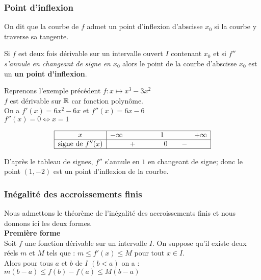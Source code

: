   \subsubsection*{Point d'inflexion}
  \begin{definition}
  On dit que la courbe de $ f $ admet un point d'inflexion d'abscisse $ x_{0} $ si la courbe y traverse sa tangente.
  \end{definition}

   \begin{theorem}
   Si $ f $ est deux fois dérivable sur  un intervalle ouvert $ I $ contenant $ x_0 $  et si $ f'' $  \emph{ s'annule en changeant de signe  en $ x_0 $} alors le point de la courbe d'abscisse $ x_0 $  est un \textbf{ un point  d'inflexion}.
   \end{theorem}
   
   \begin{example}
   Reprenons l'exemple précédent $ f: x\mapsto x^{3}-3x^{2} $\\ 
   $ f $ est dérivable sur $ \mathbb{R} $ car fonction polynôme.\\
   On a $ f'(x)= 6x^2-6x$ et $ f''(x)= 6x-6 $\\
   $ f''(x)=0 \Longleftrightarrow x=1 $
   \renewcommand{\arraystretch}{1.5}

 \[\begin{array}{|c|ccccc|}
\hline
x & -\infty & & 1 & & +\infty\\ \hline
\text{signe de } f''(x) & & +\qquad &\quad 0  & \quad - & \\
\hline
\end{array}\]

D'après le tableau de signes,  $ f'' $ s'annule en  $ 1 $ en changeant de signe; donc le point $ (1,-2) $ est un point d'inflexion de la courbe.
   \end{example}
   
  \subsubsection*{Inégalité des accroissements finis}
  Nous admettons le théorème de l'inégalité des accroissements finis et nous donnons ici les deux formes.\\
\textbf{\color{magenta}Première forme} \\
 Soit $ f $ une fonction dérivable sur un intervalle $ I $. On suppose qu'il existe deux réels $m $ et $ M$ tels que :\colorbox{green!20!}{ $ m\leq f'(x) \leq M $} \quad pour tout $ x\in I $. \\ Alors pour tous $a $ et $ b$ de $ I $  $(b < a)  $ on a :\colorbox{green!20!} {$ m(b-a)\leq f(b)-f(a) \leq M(b-a) $}  \\
 

